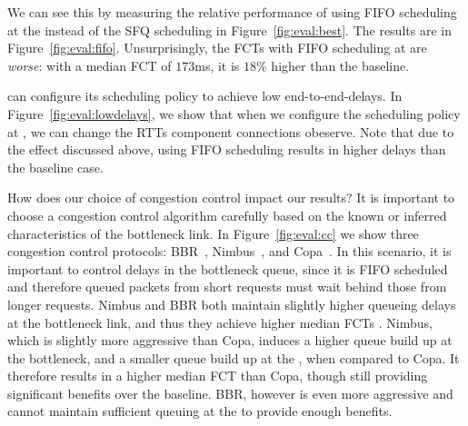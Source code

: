 

We can see this by measuring the relative performance of using FIFO scheduling at the \name instead of the SFQ scheduling in Figure~\ref{fig:eval:best}.
The results are in Figure~\ref{fig:eval:fifo}. 
Unsurprisingly, the FCTs with FIFO scheduling at \name are \emph{worse}: with a median FCT of $173$ms, it is $18$\% higher than the baseline. 




\name can configure its scheduling policy to achieve low end-to-end-delays.
In Figure~\ref{fig:eval:lowdelays}, we show that when we configure the scheduling policy at \inbox, we can change the RTTs component connections obeserve.
Note that due to the effect discussed above, using FIFO scheduling results in higher delays than the baseline case.

 How does our choice of congestion control impact our results? 
It is important to choose a congestion control algorithm carefully based on the known or inferred characteristics of the bottleneck link. 
In Figure~\ref{fig:eval:cc} we show three congestion control protocols: BBR~\cite{bbr}, Nimbus~\cite{nimbus}, and Copa~\cite{copa}.
In this scenario, it is important to control delays in the bottleneck queue, since it is FIFO scheduled and therefore queued packets from short requests must wait behind those from longer requests. Nimbus and BBR both maintain slightly higher queueing delays at the bottleneck link, and thus they achieve higher median FCTs . 
Nimbus, which is slightly more aggressive than Copa, induces a higher queue build up at the bottleneck, and a smaller queue build up at the \name, when compared to Copa. It therefore results in a higher median FCT than Copa, though still providing significant benefits over the baseline. BBR, however is even more aggressive and cannot maintain sufficient queuing at the \name to provide enough benefits.





